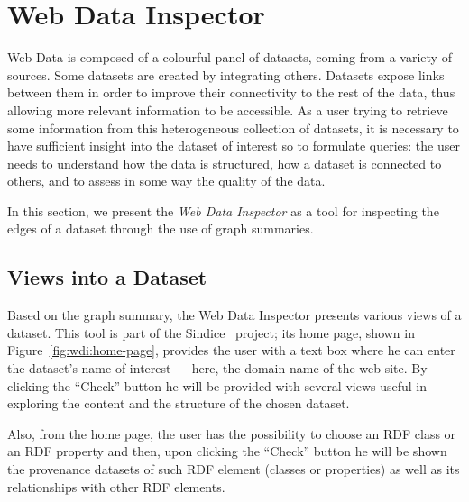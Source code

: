 \section{Web Data Inspector}
\label{sec:web-data-inspector}

Web Data is composed of a colourful panel of datasets, coming from a variety of sources. Some datasets are created by integrating others. Datasets expose links between them in order to improve their connectivity to the rest of the data, thus allowing more relevant information to be accessible. As a user trying to retrieve some information from this heterogeneous collection of datasets, it is necessary to have sufficient insight into the dataset of interest so to formulate queries: the user needs to understand how the data is structured, how a dataset is connected to others, and to assess in some way the quality of the data.

In this section, we present the \emph{Web Data Inspector} as a tool for inspecting the edges of a dataset through the use of graph summaries.

\subsection{Views into a Dataset}

Based on the graph summary, the Web Data Inspector presents various views of a dataset. This tool is part of the Sindice~\cite{oren:2008:sdl} project; its home page, shown in Figure~\ref{fig:wdi:home-page}, provides the user with a text box where he can enter the dataset's name of interest --- here, the domain name of the web site. By clicking the ``Check'' button he will be provided with several views useful in exploring the content and the structure of the chosen dataset.

Also, from the home page, the user has the possibility to choose an RDF class or an RDF property and then, upon clicking the ``Check'' button he will be shown the provenance datasets of such RDF element (classes or properties) as well as its relationships with other RDF elements.

